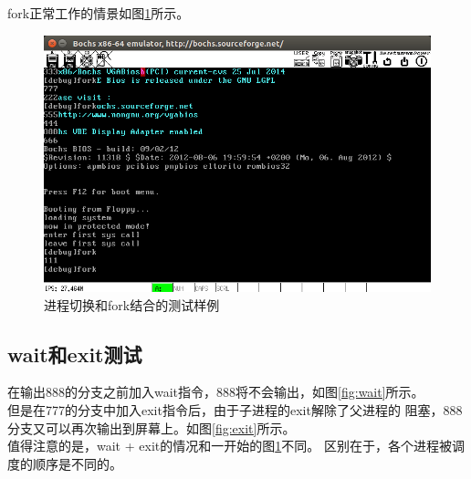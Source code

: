 \documentclass[a4paper]{article}
\begin{document}
    fork正常工作的情景如图\ref{fig:ts_n_fork}所示。
    \begin{figure}
        \begin{center}
        \includegraphics[scale=0.4]{./assets/pm-ex7-taskswitch-and-fork.png}
        \caption{进程切换和fork结合的测试样例\label{fig:ts_n_fork}} 
        \end{center} 
    \end{figure} 
    \subsection{wait和exit测试}
    在输出888的分支之前加入wait指令，888将不会输出，如图\ref{fig:wait}所示。\\

    但是在777的分支中加入exit指令后，由于子进程的exit解除了父进程的
    阻塞，888分支又可以再次输出到屏幕上。如图\ref{fig:exit}所示。\\ 

    值得注意的是，wait + exit的情况和一开始的图\ref{fig:ts_n_fork}不同。
    区别在于，各个进程被调度的顺序是不同的。\\
    
\end{document}
